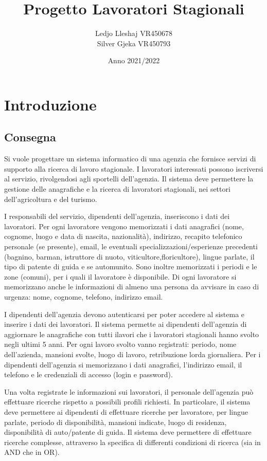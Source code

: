 \documentclass[ 4paper,11pt,openany]{book}
\title{Progetto Lavoratori Stagionali}
\author{Ledjo Lleshaj VR450678\\Silver Gjeka VR450793}
\date{Anno 2021/2022}
\begin{document}
\frontmatter
\maketitle
\tableofcontents 

\mainmatter
\chapter{Introduzione}
\section{Consegna}
Si vuole progettare un sistema informatico di una agenzia che fornisce servizi di supporto alla ricerca di lavoro stagionale. I lavoratori interessati possono iscriversi al servizio, rivolgendosi agli sportelli dell’agenzia. Il sistema deve permettere la gestione delle anagrafiche e la ricerca di lavoratori
stagionali, nei settori dell’agricoltura e del turismo. 

I responsabili del servizio, dipendenti dell’agenzia, inseriscono i dati dei lavoratori. 
Per ogni lavoratore vengono memorizzati i dati anagrafici (nome, cognome, luogo e data di nascita, nazionalità), indirizzo, recapito telefonico personale (se presente), email, le eventuali
specializzazioni/esperienze precedenti (bagnino, barman, istruttore di nuoto, viticultore,floricultore), lingue parlate, il tipo di patente di guida e se automunito. Sono inoltre memorizzati i periodi e le zone (comuni), per i quali il lavoratore è disponibile. Di ogni lavoratore si memorizzano anche le informazioni di almeno una persona da avvisare in caso di urgenza: nome, cognome, telefono, indirizzo email. 

I dipendenti dell’agenzia devono autenticarsi per poter accedere al sistema e inserire i dati dei lavoratori. Il sistema permette ai dipendenti dell’agenzia di aggiornare le anagrafiche con tutti ilavori che i lavoratori stagionali hanno svolto negli ultimi 5 anni. 
Per ogni lavoro svolto vanno registrati: periodo, nome dell’azienda, mansioni svolte, luogo di lavoro, retribuzione lorda giornaliera. Per i dipendenti dell’agenzia si memorizzano i dati anagrafici, l’indirizzo email, il telefono e le credenziali di accesso (login e password).

Una volta registrate le informazioni sui lavoratori, il personale dell’agenzia può effettuare ricerche rispetto a possibili profili richiesti.
In particolare, il sistema deve permettere ai dipendenti di effettuare ricerche per lavoratore, per lingue parlate, periodo di disponibilità, mansioni indicate, luogo di residenza, disponibilità di auto/patente di guida. Il sistema deve permettere di effettuare ricerche complesse, attraverso la specifica di differenti condizioni di ricerca (sia in AND che in OR).
 \pagebreak
\end{document}

